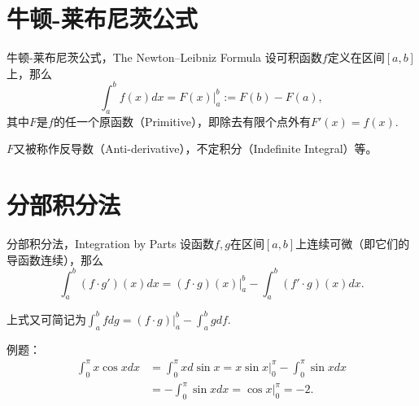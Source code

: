 
\section{牛顿-莱布尼茨公式}


\begin{frame}

\begin{block}{牛顿-莱布尼茨公式，The Newton–Leibniz Formula}
设可积函数$f$定义在区间$[a,b]$上，那么
$$\int_a^b f(x)dx = \left.F(x)\right\vert_a^b := F(b) - F(a),$$
其中$F$是$f$的任一个原函数（Primitive），即{\color{zkblue!50}除去有限个点外有}$F'(x) = f(x)$.
\end{block}

\vspace{2em}
\pause

$F$又被称作反导数（Anti-derivative），不定积分（Indefinite Integral）等。

\end{frame}



\section{分部积分法}


\begin{frame}

\begin{block}{分部积分法，Integration by Parts}
设函数$f,g$在区间$[a,b]$上连续可微（即它们的导函数连续），那么
$$\int_a^b (f\cdot g')(x)dx = (f\cdot g)(x)|_a^b - \int_a^b (f'\cdot g)(x)dx.$$

\pause

上式又可简记为\(\displaystyle \int_a^b fdg = (f\cdot g)|_a^b - \int_a^b gdf.\)
\end{block}

\pause

例题：
\begin{align*}
\int_0^{\pi} x \cos x dx & = \int_0^{\pi} x d\sin x = x\sin x|_0^{\pi} - \int_0^{\pi} \sin x dx \\
& = - \int_0^{\pi} \sin x dx = \cos x|_0^{\pi} = -2.
\end{align*}

\end{frame}

